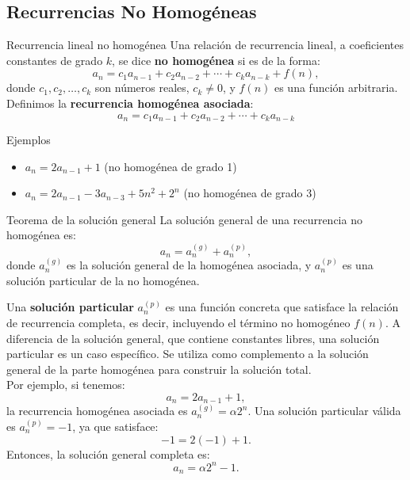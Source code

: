\subsection{Recurrencias No Homogéneas}
\begin{definitionblock}{Recurrencia lineal no homogénea}
Una relación de recurrencia lineal, a coeficientes constantes de grado $k$, se dice \textbf{no homogénea} si es de la forma:
\[
a_n = c_1 a_{n-1} + c_2 a_{n-2} + \cdots + c_k a_{n-k} + f(n),
\]
donde $c_1, c_2, \dots, c_k$ son números reales, $c_k \neq 0$, y $f(n)$ es una función arbitraria. \\
Definimos la \textbf{recurrencia homogénea asociada}:
\[
a_n = c_1 a_{n-1} + c_2 a_{n-2} + \cdots + c_k a_{n-k}
\]
\end{definitionblock}

\begin{exampleblock}{Ejemplos}
\begin{itemize}
  \item $a_n = 2a_{n-1} + 1$ \hfill (no homogénea de grado 1)
  \item $a_n = 2a_{n-1} - 3a_{n-3} + 5n^2 + 2^n$ \hfill (no homogénea de grado 3)
\end{itemize}
\end{exampleblock}

\begin{thmblock}{Teorema de la solución general}
La solución general de una recurrencia no homogénea es:
\[
a_n = a_n^{(g)} + a_n^{(p)},
\]
donde $a_n^{(g)}$ es la solución general de la homogénea asociada, y $a_n^{(p)}$ es una solución particular de la no homogénea.
\end{thmblock}

\noindent Una \textbf{solución particular} $a_n^{(p)}$ es una función concreta que satisface la relación de recurrencia completa, es decir, incluyendo el término no homogéneo $f(n)$. A diferencia de la solución general, que contiene constantes libres, una solución particular es un caso específico. Se utiliza como complemento a la solución general de la parte homogénea para construir la solución total.\\
Por ejemplo, si tenemos:
\[
a_n = 2a_{n-1} + 1,
\]
la recurrencia homogénea asociada es $a_n^{(g)} = \alpha 2^n$. Una solución particular válida es $a_n^{(p)} = -1$, ya que satisface:
\[
-1 = 2(-1) + 1.
\]
Entonces, la solución general completa es:
\[
a_n = \alpha 2^n - 1.
\]

